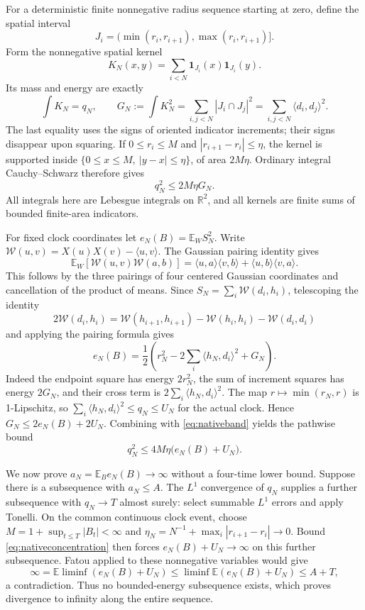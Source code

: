 \documentclass[11pt]{article}
\theoremstyle{remark}\newtheorem{remark}[theorem]{Remark}
\newcommand{\R}{\mathbb R}\newcommand{\Pconv}{\xrightarrow{\mathrm P}}
\begin{document}
For a deterministic finite nonnegative radius sequence starting at
zero, define the spatial interval
\[ J_i=(\min(r_i,r_{i+1}),\max(r_i,r_{i+1})]. \]
Form the nonnegative spatial kernel
\[
 K_N(x,y)=\sum_{i<N}\mathbf1_{J_i}(x)\mathbf1_{J_i}(y).
\]
Its mass and energy are exactly
\[
 \int K_N=q_N,\qquad
 G_N:=\int K_N^2=
 \sum_{i,j<N}|J_i\cap J_j|^2
 =\sum_{i,j<N}\langle d_i,d_j\rangle^2.
\]
The last equality uses the signs of oriented indicator increments;
their signs disappear upon squaring. If $0\leq r_i\leq M$ and
$|r_{i+1}-r_i|\leq\eta$, the kernel is supported inside
$\{0\leq x\leq M,\ |y-x|\leq\eta\}$, of area $2M\eta$.
Ordinary integral Cauchy--Schwarz therefore gives
\begin{equation}\label{eq:nativeband}
 q_N^2\leq2M\eta G_N.
\end{equation}
All integrals here are Lebesgue integrals on $\R^2$, and all kernels
are finite sums of bounded finite-area indicators.

For fixed clock coordinates let $e_N(B)=\mathbb E_W S_N^2$.
Write $\mathcal W(u,v)=X(u)X(v)-\langle u,v\rangle$.
The Gaussian pairing identity gives
\[
 \mathbb E_W[\mathcal W(u,v)\mathcal W(a,b)]
 =\langle u,a\rangle\langle v,b\rangle
  +\langle u,b\rangle\langle v,a\rangle.
\]
This follows by the three pairings of four centered Gaussian
coordinates and cancellation of the product of means.
Since $S_N=\sum_i\mathcal W(d_i,h_i)$, telescoping the identity
\[
 2\mathcal W(d_i,h_i)
 =\mathcal W(h_{i+1},h_{i+1})-\mathcal W(h_i,h_i)
   -\mathcal W(d_i,d_i)
\]
and applying the pairing formula gives
\[
 e_N(B)=\frac12\left(r_N^2
      -2\sum_i\langle h_N,d_i\rangle^2+G_N\right).
\]
Indeed the endpoint square has energy $2r_N^2$, the sum of
increment squares has energy $2G_N$, and their cross term is
$2\sum_i\langle h_N,d_i\rangle^2$.
The map $r\mapsto\min(r_N,r)$ is 1-Lipschitz, so
$\sum_i\langle h_N,d_i\rangle^2\leq q_N\leq U_N$ for the
actual clock. Hence $G_N\leq2e_N(B)+2U_N$.
Combining with \eqref{eq:nativeband} yields the pathwise bound
\begin{equation}\label{eq:nativeconcentration}
 q_N^2\leq4M\eta\bigl(e_N(B)+U_N\bigr).
\end{equation}

We now prove $a_N=\mathbb E_B e_N(B)\to\infty$ without a
four-time lower bound. Suppose there is a subsequence with $a_N\leq A$.
The $L^1$ convergence of $q_N$ supplies a further subsequence with
$q_N\to T$ almost surely: select summable $L^1$ errors and apply
Tonelli. On the common continuous clock event, choose
$M=1+\sup_{t\leq T}|B_t|<\infty$ and
$\eta_N=N^{-1}+\max_i|r_{i+1}-r_i|\to0$.
Bound \eqref{eq:nativeconcentration} then forces
$e_N(B)+U_N\to\infty$ on this further subsequence.
Fatou applied to these nonnegative variables would give
\[
 \infty=\mathbb E\liminf(e_N(B)+U_N)
 \leq\liminf\mathbb E(e_N(B)+U_N)\leq A+T,
\]
a contradiction. Thus no bounded-energy subsequence exists,
which proves divergence to infinity along the entire sequence.
\end{document}

